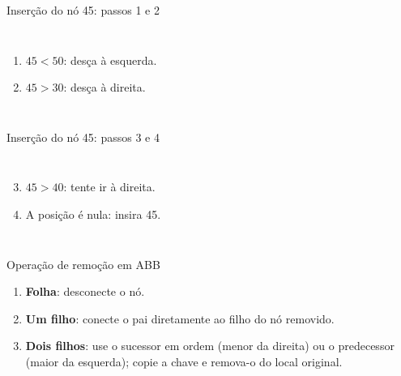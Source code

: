 \documentclass[aspectratio=43,10pt]{beamer}
\begin{document}
\begin{frame}{Inserção do nó 45: passos 1 e 2}
  \begin{columns}
    \centering
    \begin{enumerate}
      \item $45<50$: desça à esquerda.
      \item $45>30$: desça à direita.
    \end{enumerate}
  \end{columns}
\end{frame}

\begin{frame}{Inserção do nó 45: passos 3 e 4}
  \begin{columns}
    \centering
    \begin{enumerate}
      \setcounter{enumi}{2}
      \item $45>40$: tente ir à direita.
      \item A posição é nula: insira 45.
    \end{enumerate}
  \end{columns}
\end{frame}

\begin{frame}{Operação de remoção em ABB}
  \begin{enumerate}
    \item \textbf{Folha}: desconecte o nó.
    \item \textbf{Um filho}: conecte o pai diretamente ao filho do nó removido.
    \item \textbf{Dois filhos}: use o sucessor em ordem (menor da direita) ou o predecessor (maior da esquerda); copie a chave e remova-o do local original.
  \end{enumerate}
\end{frame}
\end{document}
